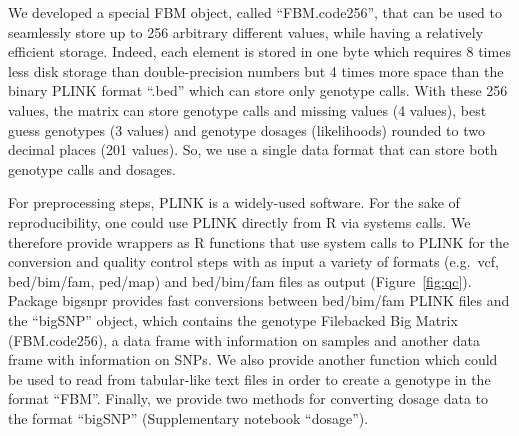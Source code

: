 \documentclass{bioinfo}
\begin{document}
\begin{methods}
{\color{red}
We developed a special FBM object, called ``FBM.code256'', that can be used to seamlessly store up to 256 arbitrary different values, while having a relatively efficient storage. Indeed, each element is stored in one byte which requires 8 times less disk storage than double-precision numbers but 4 times more space than the binary PLINK format ``.bed'' which can store only genotype calls. With these 256 values, the matrix can store genotype calls and missing values (4 values), best guess genotypes (3 values) and genotype dosages (likelihoods) rounded to two decimal places (201 values). So, we use a single data format that can store both genotype calls and dosages.

For preprocessing steps, PLINK is a widely-used software. For the sake of reproducibility, one could use PLINK directly from R via systems calls. We therefore provide wrappers as R functions that use system calls to PLINK for the conversion and quality control steps with as input a variety of formats (e.g.\ vcf, bed/bim/fam, ped/map) and bed/bim/fam files as output (Figure~\ref{fig:qc}).
Package bigsnpr provides fast conversions between bed/bim/fam PLINK files and the ``bigSNP'' object, which contains the genotype Filebacked Big Matrix (FBM.code256), a data frame with information on samples and another data frame with information on SNPs. We also provide another function which could be used to read from tabular-like text files in order to create a genotype in the format ``FBM''. Finally, we provide two methods for converting dosage data to the format ``bigSNP'' (Supplementary notebook ``dosage'').

}
\end{methods}
\end{document}
